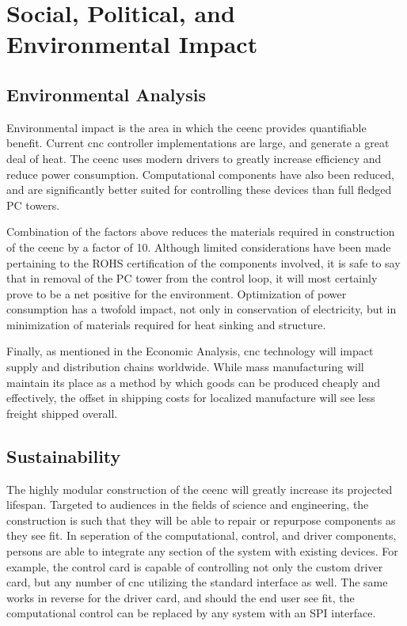 \chapter{Social, Political, and Environmental Impact}

\section{Environmental Analysis}
Environmental impact is the area in which the \gls{ceenc} provides quantifiable benefit. 
Current \gls{cnc} controller implementations are large, and generate a great deal of heat. 
The \gls{ceenc} uses modern drivers to greatly increase efficiency and reduce power consumption. 
Computational components have also been reduced, and are significantly better suited for controlling these devices than full fledged PC towers. 

Combination of the factors above reduces the materials required in construction of the \gls{ceenc} by a factor of 10. 
Although limited considerations have been made pertaining to the ROHS certification of the components involved, it is safe to say that in removal of the PC tower from the control loop, it will most certainly prove to be a net positive for the environment. 
Optimization of power consumption has a twofold impact, not only in conservation of electricity, but in minimization of materials required for heat sinking and structure.

Finally, as mentioned in the Economic Analysis, \gls{cnc} technology will impact supply and distribution chains worldwide. \cite{3dprintsustain}
While mass manufacturing will maintain its place as a method by which goods can be produced cheaply and effectively, the offset in shipping costs for localized manufacture will see less freight shipped overall. \cite{3dprintenvironment}

\section{Sustainability}
The highly modular construction of the \gls{ceenc} will greatly increase its projected lifespan.
Targeted to audiences in the fields of science and engineering, the construction is such that they will be able to repair or repurpose components as they see fit.
In seperation of the computational, control, and driver components, persons are able to integrate any section of the system with existing devices.
For example, the control card is capable of controlling not only the custom driver card, but any number of \gls{cnc} utilizing the standard interface as well.
The same works in reverse for the driver card, and should the end user see fit, the computational control can be replaced by any system with an SPI interface.

